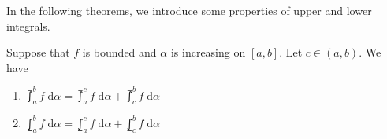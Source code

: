 \documentclass[thmcnt=section, 12pt]{my-elegantbook}
\begin{document}

In the following theorems, we introduce some properties of upper and lower integrals.

\begin{theorem}
    Suppose that $f$ is bounded and $\alpha$ is increasing on $[a, b]$. Let $c \in (a, b)$. We have 
    \begin{enumerate}
        \item $\upint_a^b f \; \mathrm{d}\alpha = \upint_a^c f \; \mathrm{d}\alpha + \upint_c^b f \; \mathrm{d}\alpha$
        \item $\lowint_a^b f \; \mathrm{d}\alpha = \lowint_a^c f \; \mathrm{d}\alpha + \lowint_c^b f \; \mathrm{d}\alpha$
    \end{enumerate}
\end{theorem}
\end{document}
